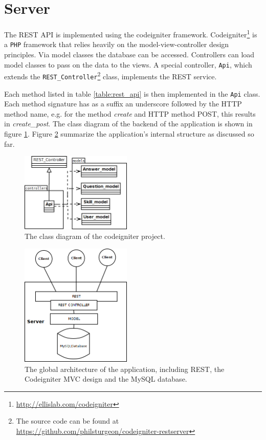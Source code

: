 \section{Server}

The REST API is implemented using the codeigniter framework. Codeigniter\footnote{\url{http://ellislab.com/codeigniter}} is a \texttt{PHP} framework that relies heavily on the model-view-controller design principles. Via model classes the database can be accessed. Controllers can load model classes to pass on the data to the views. A special controller, \texttt{Api}, which extends the \texttt{REST\_Controller}\footnote{The source code can be found at \url{https://github.com/philsturgeon/codeigniter-restserver}} class, implements the REST service.

Each method listed in table \ref{table:rest_api} is then implemented in the \texttt{Api} class. Each method signature has as a suffix an underscore followed by the HTTP method name, e.g. for the method \emph{create} and HTTP method POST, this results in \emph{create\_post}. The class diagram of the backend of the application is shown in figure \ref{figure:codeigniter:classdiagram}. Figure \ref{figure:architecture:global2} summarize the application's internal structure as discussed so far.

\begin{figure}
	\begin{center}
		\includegraphics[width=200px]{img/codeigniter_class_diagram}
		\caption{The class diagram of the codeigniter project.}
		\label{figure:codeigniter:classdiagram}
	\end{center}
\end{figure}


\begin{figure}
	\begin{center}
		\includegraphics[width=200px]{img/architecture_global2}
		\caption{The global architecture of the application, including REST, the Codeigniter MVC design and the MySQL database.}
		\label{figure:architecture:global2}
	\end{center}
\end{figure}

